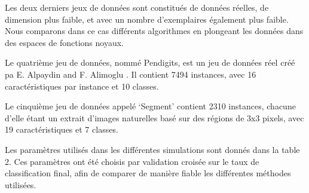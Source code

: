 \documentclass[twocolumn]{article}
\begin{document}
Les deux derniers jeux de données sont constitués de données réelles, de dimension plus faible, et avec un nombre d'exemplaires également plus faible. Nous comparons dans ce cas différents algorithmes en plongeant les données dans des espaces de fonctions noyaux.  

Le quatrième jeu de données, nommé Pendigits, est un jeu de données réel créé pa E. Alpaydin and F. Alimoglu \cite{alimoglu1996combining}. 
Il contient 7494 instances, avec 16 caractéristiques par instance et 10 classes. 

Le cinquième jeu de données appelé `Segment' \cite{Lichman:2013} contient 2310 instances, chacune d'elle étant un extrait d'images naturelles basé sur des régions de 3x3 pixels, avec 19 caractéristiques et 7 classes. 



Les paramètres utilisés dans les différentes simulations sont donnés dans la table 2. Ces paramètres ont été choisis par validation croisée sur le taux de classification final, afin de comparer de manière fiable les différentes méthodes utilisées. 
\end{document}
